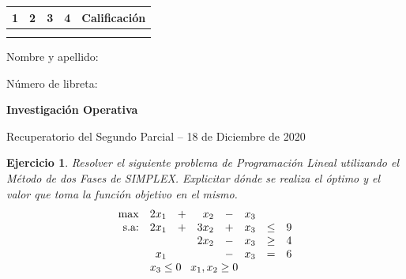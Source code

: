 \documentclass[a4paper,oneside,12pt]{amsart}
\newcommand{\nombremateria}
{Investigaci\'on Operativa}
\newcommand{\numeroparcial}
    { Recuperatorio del Segundo Parcial }
\newcommand{\fecha}
    {18 de Diciembre de 2020}
\newtheorem{quest}{Ejercicio}
\begin{document}
\hfill \hfill
\begin{tabular}[c]{|c|c|c|c|c|}
\hline 
1 & 2 & 3 & 4 & Calificaci\'on \\ \hline \hline
\hspace{1.2 cm} & \hspace{1.2 cm} & \hspace{1.2 cm} & \hspace{1.2 cm} &\hspace{1.5 cm} \\
\hspace{1.2 cm} & \hspace{1.2 cm} & \hspace{1.2 cm} & \hspace{1.2 cm} &\hspace{1.5 cm} \\ \hline

\end{tabular}

\vspace{-1cm}

\noindent Nombre y apellido:

\vspace{0.2cm}

\noindent Número de libreta:

\noindent \hrulefill 

\smallskip
\renewcommand{\baselinestretch}{1.1}

\begin{center}
	\large \textbf{\nombremateria} 
	
	\numeroparcial -- \fecha
\end{center}

\vspace{.6cm}
\renewcommand{\theenumi}{\textbf{\arabic{enumi}}}


\begin{quest} 
Resolver el siguiente problema de Programación Lineal utilizando el Método de dos Fases de SIMPLEX. Explicitar dónde se realiza el óptimo y el valor que toma la función objetivo en el mismo.
    \[\begin{array}{rrrrrrrr}
        \max & 2x_1 & + & x_2 & - & x_3  \\
        \text{s.a:} & 2x_1 & + & 3x_2 & + & x_3 & \leq & 9 \\
          &  &  & 2x_2 & - & x_3 & \geq & 4 \\
          & x_1  &  &  & - & x_3 & = & 6 \\
         & \multicolumn{7}{l}{x_3\leq 0 \;\;\;x_1,x_2\geq 0}
    \end{array}
    \]

\end{quest}
\end{document}
